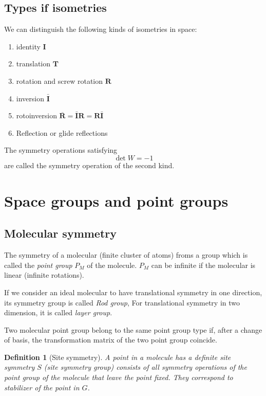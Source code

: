 \documentclass{amsart}
\newtheorem{definition}{Definition}
\begin{document}
\vspace{10pt}

\subsection*{Types if isometries}
We can distinguish the following kinds of isometries in space:
\begin{enumerate}
    \item identity $\mathbf{I}$
    \item translation $\mathbf{T}$
    \item rotation and screw rotation $\mathbf{R}$
    \item inversion $\bar{\mathbf{I}}$
    \item rotoinversion $\overline{\mathbf{R}} = \bar{\mathbf{I}} \mathbf{R} = \mathbf{R} \bar{\mathbf{I}}$
    \item Reflection or glide reflections
\end{enumerate}
The symmetry operations satisfying \[\det W = -1\] are called the symmetry operation of the second kind.

\vspace{10pt}

\section*{Space groups and point groups}
\subsection*{Molecular symmetry}
The symmetry of a molecular (finite cluster of atoms) froms a group which is called the \emph{point group} $P_M$ of the molecule. $P_M$
can be infinite if the molecular is linear (infinite rotations). 

If we consider an ideal molecular to have translational symmetry in one direction, its symmetry group is called \emph{Rod group}, 
For translational symmetry in two dimension, it is called \emph{layer group}.

Two molecular point group belong to the same point group type if, after a change of basis, the transformation matrix of the two point group
coincide. 

\vspace{10pt}

\begin{definition}
    [Site symmetry]
    A point in a molecule has a definite site symmetry $S$ (site symmetry group) consists of all symmetry operations of the point group
    of the molecule that leave the point fixed. They correspond to stabilizer of the point in $G$.
\end{definition}
\end{document}
